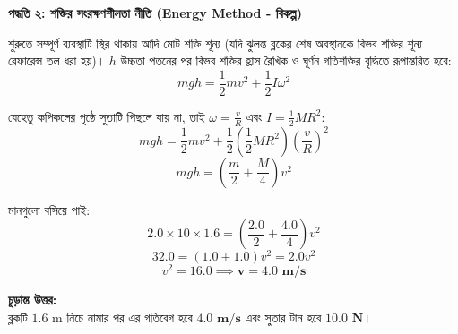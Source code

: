 \documentclass[12pt, a4paper]{article}
\begin{document}
\begin{tcolorbox}[solutionbox={সমাধান (Solution)}]
\noindent
\textbf{পদ্ধতি ২: শক্তির সংরক্ষণশীলতা নীতি (Energy Method - বিকল্প)}

\vspace{0.5em}
\noindent
শুরুতে সম্পূর্ণ ব্যবস্থাটি স্থির থাকায় আদি মোট শক্তি শূন্য (যদি ঝুলন্ত ব্লকের শেষ অবস্থানকে বিভব শক্তির শূন্য রেফারেন্স তল ধরা হয়)। $h$ উচ্চতা পতনের পর বিভব শক্তির হ্রাস রৈখিক ও ঘূর্ণন গতিশক্তির বৃদ্ধিতে রূপান্তরিত হবে:
$$m g h = \frac{1}{2} m v^2 + \frac{1}{2} I \omega^2$$

যেহেতু কপিকলের পৃষ্ঠে সুতাটি পিছলে যায় না, তাই $\omega = \frac{v}{R}$ এবং $I = \frac{1}{2} M R^2$: 
$$m g h = \frac{1}{2} m v^2 + \frac{1}{2} \left( \frac{1}{2} M R^2 \right) \left( \frac{v}{R} \right)^2$$ 
$$m g h = \left( \frac{m}{2} + \frac{M}{4} \right) v^2$$

মানগুলো বসিয়ে পাই: 
$$2.0 \times 10 \times 1.6 = \left( \frac{2.0}{2} + \frac{4.0}{4} \right) v^2$$ 
$$32.0 = (1.0 + 1.0) v^2 = 2.0 v^2$$ 
$$v^2 = 16.0 \implies \mathbf{v = 4.0\text{ m/s}}$$

\vspace{1em}
\begin{tcolorbox}[answerbox]
\textbf{চূড়ান্ত উত্তর:} \\
ব্লকটি $1.6\text{ m}$ নিচে নামার পর এর গতিবেগ হবে $\mathbf{4.0\text{ m/s}}$ এবং সুতার টান হবে $\mathbf{10.0\text{ N}}$।
\end{tcolorbox}
\end{tcolorbox}
\end{document}
